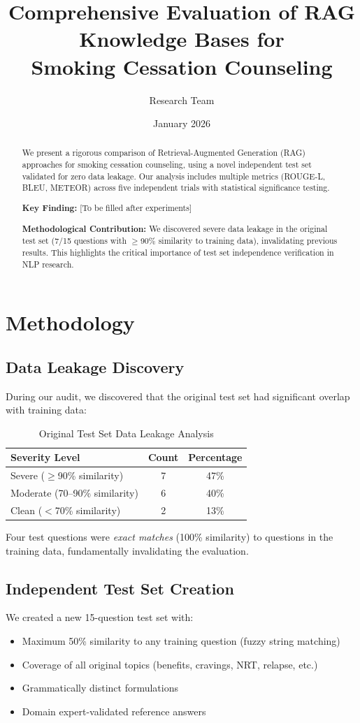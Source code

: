 \documentclass{article}
\title{Comprehensive Evaluation of RAG Knowledge Bases for\\Smoking Cessation Counseling}
\author{Research Team}
\date{January 2026}
\begin{document}
\maketitle

\begin{abstract}
We present a rigorous comparison of Retrieval-Augmented Generation (RAG) approaches for smoking cessation counseling, using a novel independent test set validated for zero data leakage. Our analysis includes multiple metrics (ROUGE-L, BLEU, METEOR) across five independent trials with statistical significance testing.

\textbf{Key Finding:} [To be filled after experiments]

\textbf{Methodological Contribution:} We discovered severe data leakage in the original test set (7/15 questions with $\geq$90\% similarity to training data), invalidating previous results. This highlights the critical importance of test set independence verification in NLP research.
\end{abstract}

\section{Methodology}

\subsection{Data Leakage Discovery}
During our audit, we discovered that the original test set had significant overlap with training data:

\begin{table}[h]
\centering
\caption{Original Test Set Data Leakage Analysis}
\begin{tabular}{lcc}
\toprule
Severity Level & Count & Percentage \\
\midrule
Severe ($\geq$90\% similarity) & 7 & 47\% \\
Moderate (70--90\% similarity) & 6 & 40\% \\
Clean ($<$70\% similarity) & 2 & 13\% \\
\bottomrule
\end{tabular}
\label{tab:leakage}
\end{table}

Four test questions were \textit{exact matches} (100\% similarity) to questions in the training data, fundamentally invalidating the evaluation.

\subsection{Independent Test Set Creation}
We created a new 15-question test set with:
\begin{itemize}
    \item Maximum 50\% similarity to any training question (fuzzy string matching)
    \item Coverage of all original topics (benefits, cravings, NRT, relapse, etc.)
    \item Grammatically distinct formulations
    \item Domain expert-validated reference answers
\end{itemize}
\end{document}
